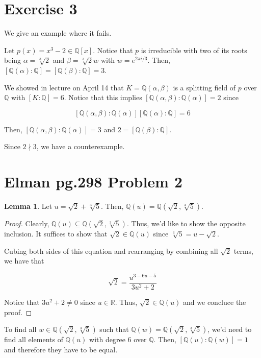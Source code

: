 \documentclass{article}
\theoremstyle{definition}
\newtheorem{lemma}[theorem]{Lemma}
\newcommand{\R}{\mathbb{R}}
\newcommand{\Q}{\mathbb{Q}}
\begin{document}
\newpage

\section{Exercise 3}

We give an example where it fails.

Let $p(x) = x^{3} - 2 \in \Q[x]$. Notice that $p$ is irreducible with two of its roots being
$\alpha = \sqrt[3]{2}$ and $\beta =  \sqrt[3]{2}w$ with $w = e^{2\pi i/3}$. Then, $[\Q(\alpha):\Q] = [\Q(\beta):\Q] = 3$.

We showed in lecture on April 14 that $K = \Q(\alpha, \beta)$ is a splitting field of $p$ over $\Q$
with $[K:\Q] = 6$. Notice that this implies $[\Q(\alpha, \beta):\Q(\alpha)] = 2$ since

\[ [\Q(\alpha, \beta):\Q(\alpha)][\Q(\alpha):\Q] = 6\]

Then, $[\Q(\alpha, \beta):\Q(\alpha)] = 3$ and $2 = [\Q(\beta):\Q]$.

Since $2 \nmid 3$, we have a counterexample.

\newpage

\section{Elman pg.298 Problem 2}

\begin{lemma}
    Let $u = \sqrt{2} + \sqrt[3]{5}$. Then, $\Q(u) = \Q(\sqrt{2}, \sqrt[3]{5})$.
\end{lemma}
\begin{proof}
    Clearly, $\Q(u) \subseteq \Q(\sqrt{2}, \sqrt[3]{5})$. Thus, we'd like to show the opposite inclusion.
    It suffices to show that $\sqrt{2} \in \Q(u)$ since $\sqrt[3]{5} = u - \sqrt{2}$.

    Cubing both sides of this equation and rearranging by combining all $\sqrt{2}$ terms, we have that 

    \[ \sqrt{2} = \frac{u^{3 - 6u - 5}}{3u^{2} + 2}\]

    Notice that $3u^{2} + 2 \neq 0$ since $u \in \R$. Thus, $\sqrt{2} \in \Q(u)$ and we concluce the proof.
\end{proof}

To find all $w \in \Q(\sqrt{2}, \sqrt[3]{5})$ such that $\Q(w) =  \Q(\sqrt{2}, \sqrt[3]{5})$, we'd need to find
all elements of $\Q(u)$ with degree 6 over $\Q$. Then, $[\Q(u):\Q(w)] = 1$ and therefore they have to be equal.

\newpage
\end{document}
